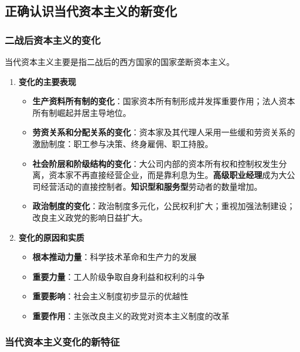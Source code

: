 \documentclass[12pt, a4paper, oneside]{ctexart}
\begin{document}
\subsection{正确认识当代资本主义的新变化}

\subsubsection{二战后资本主义的变化}

当代资本主义主要是指二战后的西方国家的国家垄断资本主义。

\begin{enumerate}
  \item {\bf 变化的主要表现}
  
  \begin{itemize}
    \item {\bf 生产资料所有制的变化}：国家资本所有制形成并发挥重要作用；法人资本所有制崛起并居主导地位。
    \item {\bf 劳资关系和分配关系的变化}：资本家及其代理人采用一些缓和劳资关系的激励制度：职工参与决策、终身雇佣、职工持股。
    \item {\bf 社会阶层和阶级结构的变化}：大公司内部的资本所有权和控制权发生分离，资本家不再直接经营企业，而是靠利息为生。\textbf{高级职业经理}成为大公司经营活动的直接控制者。\textbf{知识型和服务型}劳动者的数量增加。
    \item {\bf 政治制度的变化}：政治制度多元化，公民权利扩大；重视加强法制建设；改良主义政党的影响日益扩大。
  \end{itemize}

  \item {\bf 变化的原因和实质}
  
  \begin{itemize}
    \item {\bf 根本推动力量}：科学技术革命和生产力的发展
    \item {\bf 重要力量}：工人阶级争取自身利益和权利的斗争
    \item {\bf 重要影响}：社会主义制度初步显示的优越性
    \item {\bf 重要作用}：主张改良主义的政党对资本主义制度的改革
  \end{itemize}

\end{enumerate}

\subsubsection{当代资本主义变化的新特征}
\end{document}
